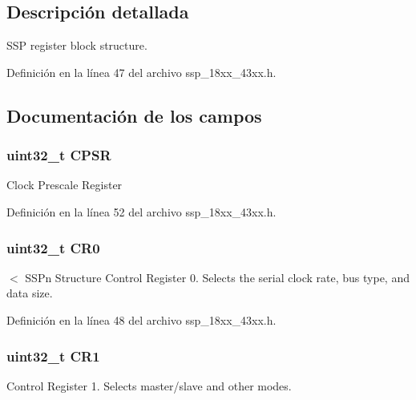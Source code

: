\subsection{Descripción detallada}
S\+SP register block structure. 

Definición en la línea 47 del archivo ssp\+\_\+18xx\+\_\+43xx.\+h.



\subsection{Documentación de los campos}
\subsubsection[{\texorpdfstring{C\+P\+SR}{CPSR}}]{ uint32\+\_\+t C\+P\+SR}\hypertarget{struct_l_p_c___s_s_p___t_a140588a82bafbf0bf0c983111aadb351}{}\label{struct_l_p_c___s_s_p___t_a140588a82bafbf0bf0c983111aadb351}
Clock Prescale Register 

Definición en la línea 52 del archivo ssp\+\_\+18xx\+\_\+43xx.\+h.

\subsubsection[{\texorpdfstring{C\+R0}{CR0}}]{ uint32\+\_\+t C\+R0}\hypertarget{struct_l_p_c___s_s_p___t_a8fe50f18067c0ecfea3157c1720a671f}{}\label{struct_l_p_c___s_s_p___t_a8fe50f18067c0ecfea3157c1720a671f}
$<$ S\+S\+Pn Structure Control Register 0. Selects the serial clock rate, bus type, and data size. 

Definición en la línea 48 del archivo ssp\+\_\+18xx\+\_\+43xx.\+h.

\subsubsection[{\texorpdfstring{C\+R1}{CR1}}]{ uint32\+\_\+t C\+R1}\hypertarget{struct_l_p_c___s_s_p___t_ab0ec7102960640751d44e92ddac994f0}{}\label{struct_l_p_c___s_s_p___t_ab0ec7102960640751d44e92ddac994f0}
Control Register 1. Selects master/slave and other modes. 

